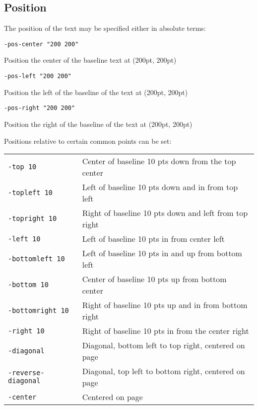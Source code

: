 \documentclass{book}
\begin{document}
  \subsection{Position}
  \label{position}
  The position of the text may be specified either in absolute terms:
  \begin{framed}
    \small\verb!-pos-center "200 200"!
  
    \vspace{2.5mm}
    \noindent Position the center of the baseline text at (200pt, 200pt)

    \vspace{2.5mm}
    \small\verb!-pos-left "200 200"!
  
    \vspace{2.5mm}
    \noindent Position the left of the baseline of the text at (200pt, 200pt)

    \vspace{2.5mm}
    \small\verb!-pos-right "200 200"!
  
    \vspace{2.5mm}
    \noindent Position the right of the baseline of the text at (200pt, 200pt)

  \end{framed}

  \noindent Positions relative to certain common points can be set:

  \begin{framed}
    \noindent\begin{tabular}{ll}
      \small\verb!-top 10! & Center of baseline 10 pts down from the top center \\
      \small\verb!-topleft 10! & Left of baseline 10 pts down and in from top left \\
      \small\verb!-topright 10! & Right of baseline 10 pts down and left from top right\\
      \small\verb!-left 10! & Left of baseline 10 pts in from center left \\
      \small\verb!-bottomleft 10! & Left of baseline 10 pts in and up from bottom left \\
      \small\verb!-bottom 10! & Center of baseline 10 pts up from bottom center\\
      \small\verb!-bottomright 10! & Right of baseline 10 pts up and in from bottom right \\
      \small\verb!-right 10! & Right of baseline 10 pts in from the center right \\
      \small\verb!-diagonal! & Diagonal, bottom left to top right, centered on page\\
      \small\verb!-reverse-diagonal! & Diagonal, top left to bottom right, centered on page\\    
      \small\verb!-center! & Centered on page\\
    \end{tabular}
  \end{framed}
\end{document}
